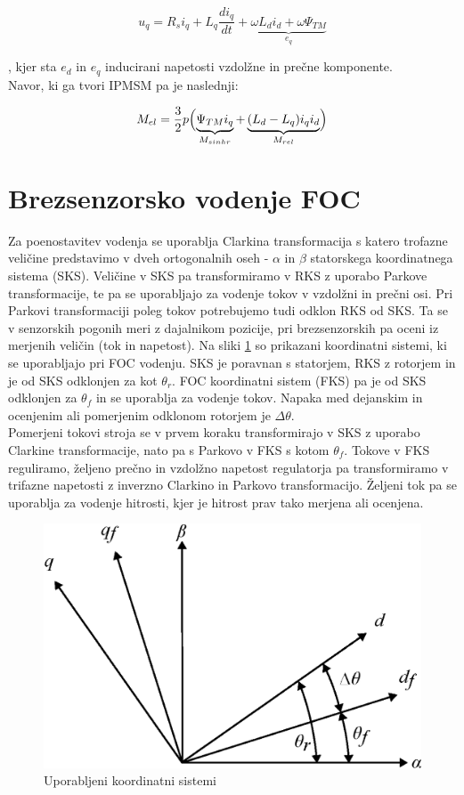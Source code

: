 \documentclass[a4paper,twoside,openright,12pt,slovene]{book}
\begin{document}
\begin{equation} \label{motorModelQ}
    u_q = R_si_q+L_q\frac{di_q}{dt}+\underbrace{\omega L_di_d + \omega\Psi_{TM}}_{e_q}
\end{equation}

, kjer sta $e_d$ in $e_q$ inducirani napetosti vzdolžne in prečne komponente.
\\
Navor, ki ga tvori IPMSM pa je naslednji:

\begin{equation}
    M_{el} = \frac{3}{2}p\Bigl(\underbrace{\Psi_{TM}i_q}_{M_{sinhr}}+\underbrace{(L_d-L_q)i_qi_d}_{M_{rel}}\Bigr)
\end{equation}



\section{Brezsenzorsko vodenje FOC}

Za poenostavitev vodenja se uporablja Clarkina transformacija s katero trofazne veličine predstavimo v dveh ortogonalnih oseh - $\alpha$ in $\beta$ statorskega koordinatnega sistema (SKS). Veličine v
SKS pa transformiramo v RKS z uporabo Parkove transformacije, te pa se uporabljajo za vodenje tokov v vzdolžni in prečni osi. Pri Parkovi transformaciji poleg tokov potrebujemo tudi odklon RKS od SKS.
Ta se v senzorskih pogonih meri z dajalnikom pozicije, pri brezsenzorskih pa oceni iz merjenih veličin (tok in napetost). Na sliki \ref{koordinatniSistemSimple} so prikazani koordinatni sistemi, ki se
uporabljajo pri FOC vodenju. SKS je poravnan s statorjem, RKS z rotorjem in je od SKS odklonjen za kot $\theta_r$. FOC koordinatni sistem (FKS) pa je od SKS odklonjen za $\theta_f$ in se uporablja za
vodenje tokov. Napaka med dejanskim in ocenjenim ali pomerjenim odklonom rotorjem je $\Delta\theta$. 
\\
Pomerjeni tokovi stroja se v prvem koraku transformirajo v SKS z uporabo Clarkine transformacije, nato pa s Parkovo v FKS s kotom $\theta_f$. Tokove v FKS reguliramo, željeno prečno in vzdolžno
napetost regulatorja pa transformiramo v trifazne napetosti z inverzno Clarkino in Parkovo transformacijo. Željeni tok pa se uporablja za vodenje hitrosti, kjer je hitrost prav tako merjena ali
ocenjena.

\begin{figure}[!htbp]
    \centering
    \includegraphics[width=0.7\columnwidth]{Slike/Inkscape/koordinatniSistemSimple.eps}
    \caption{\label{koordinatniSistemSimple} Uporabljeni koordinatni sistemi}
\end{figure}
\end{document}
